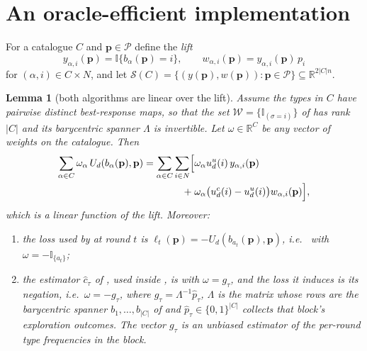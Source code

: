 \documentclass[letterpaper,9pt,twocolumn]{extarticle}
\newcommand{\pvec}{\mathbf{p}}
\newcommand{\cP}{\mathcal{P}}
\newcommand{\RR}{\mathbb{R}}
\theoremstyle{plain}
\newtheorem{lemma}[theorem]{Lemma}
\theoremstyle{definition}
\theoremstyle{remark}
\begin{document}
\section{An oracle-efficient implementation}
\label{app:oracle}


For a catalogue $C$ and $\pvec\in\cP$ define the \emph{lift}
\begin{equation}
y_{\alpha,i}(\pvec)=\mathbb{I}\{b_\alpha(\pvec)=i\},\qquad
w_{\alpha,i}(\pvec)=y_{\alpha,i}(\pvec)\,p_i
\label{eq:lift}
\end{equation}
for $(\alpha,i)\in C\times N$, and let
$\mathcal{S}(C)=\{(y(\pvec),w(\pvec)):\pvec\in\cP\}\subseteq\RR^{2|C|n}$.

\begin{lemma}[both algorithms are linear over the lift]
\label{lem:lift}
Assume the types in $C$ have pairwise distinct best-response maps, so that
the set $\mathcal{W}=\{\mathbb{I}_{(\sigma=i)}\}$ of
\citet[Section 6.3]{balcan2015} has rank $|C|$ and its barycentric spanner
$\Lambda$ is invertible. Let $\omega\in\RR^{C}$ be any vector of weights on
the catalogue. Then
\begin{align}
\sum_{\alpha\in C}\omega_\alpha\,U_d(b_\alpha(\pvec),\pvec)
=\sum_{\alpha\in C}\sum_{i\in N}\Bigl[&\omega_\alpha u_d^u(i)\,y_{\alpha,i}(\pvec)\notag\\
+\;&\omega_\alpha\bigl(u_d^c(i)-u_d^u(i)\bigr)w_{\alpha,i}(\pvec)\Bigr],
\label{eq:lift-linear}
\end{align}
which is a linear function of the lift. Moreover:
\begin{enumerate}[leftmargin=1.2em,itemsep=0.05em,topsep=0.2em]
  \item the loss used by  at round $t$ is
  $\ell_t(\pvec)=-U_d(b_{a_t}(\pvec),\pvec)$, i.e.\  with
  $\omega=-\mathbb{I}_{\{a_t\}}$;
  \item the estimator $\hat c_\tau$ of \citet[Eq.~2 and Lemma
  6.4]{balcan2015}, used inside , is  with
  $\omega=g_\tau$, and the loss it induces is its negation, i.e.\
  $\omega=-g_\tau$, where $g_\tau=\Lambda^{-1}\hat p_\tau$, $\Lambda$ is the
  matrix whose rows are the barycentric spanner $b_1,\dots,b_{|C|}$ of
  \citet[Section 6.3]{balcan2015} and $\hat p_\tau\in\{0,1\}^{|C|}$ collects
  that block's exploration outcomes. The vector $g_\tau$ is an unbiased
  estimator of the per-round type frequencies in the block.
\end{enumerate}
\end{lemma}
\end{document}
